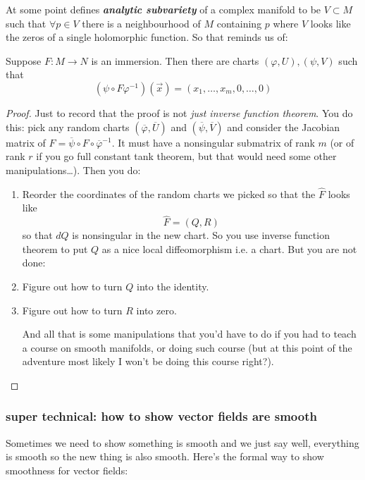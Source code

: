 At some point \cite{gri} defines \textit{\textbf{analytic subvariety}} of a complex manifold to be \(V \subset M\) such that \(\forall p \in V\) there is a neighbourhood of \(M\) containing \(p\) where \(V\) looks like the zeros of a single holomorphic function. So that reminds us of:

\begin{thm}\leavevmode
Suppose \(F:M \to N\) is an immersion. Then there are charts \((\varphi,U),(\psi,V)\) such that
\[(\psi \circ F \varphi^{-1})(\vec{x})=(x_1,\ldots,x_m,0,\ldots,0)\]
\end{thm}

\begin{proof}\leavevmode
Just to record that the proof is not \textit{just inverse function theorem}. You do this: pick any random charts \((\overline{\varphi},\overline{U})\) and \((\overline{\psi},\overline{V})\) and consider the Jacobian matrix of \(\hat{F}=\overline{\psi}\circ F \circ \overline{\varphi}^{-1}\). It must have a nonsingular submatrix of rank \(m\) (or of rank \(r\) if you go full constant tank theorem, but that would need some other manipulations…). Then you do:
\begin{enumerate}
\item Reorder the coordinates of the random charts we picked so that the \(\hat{F}\) looks like
	\[\hat{F}=(Q,R)\]
	so that \(dQ\) is nonsingular in the new chart. So you use inverse function theorem to put \(Q\) as a nice local diffeomorphism i.e. a chart. But you are not done:
 \item Figure out how to turn \(Q\) into the identity.
\item Figure out how to turn \(R\) into zero.

	And all that is some manipulations that you'd have to do if you had to teach a course on smooth manifolds, or doing such course (but at this point of the adventure most likely I won't be doing this course right?).
\end{enumerate}
\end{proof}

\subsubsection{super technical: how to show vector fields are smooth}

Sometimes we need to show something is smooth and we just say well, everything is smooth so the new thing is also smooth. Here's the formal way to show smoothness for vector fields:

